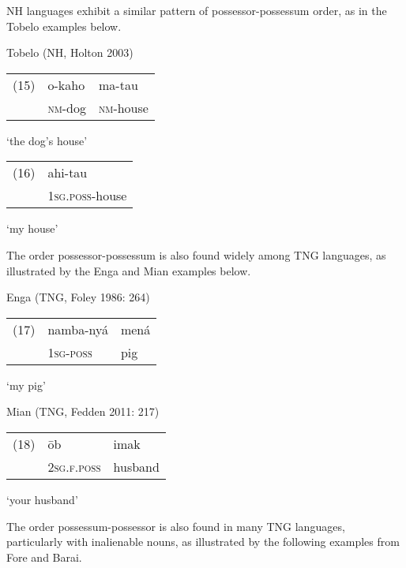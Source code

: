 NH languages exhibit a similar pattern of possessor-possessum order, as in the Tobelo examples below.

Tobelo (NH, Holton 2003)

\begin{flushleft}
\tablehead{}
\begin{supertabular}{m{0.32545984in}m{0.55315983in}m{0.6809598in}}
(15) &
o-kaho &
ma-tau\\
 &
\textsc{nm}{}-dog &
\textsc{nm}{}-house\\
\end{supertabular}
\end{flushleft}
{\textquoteleft}the dog{\textquoteright}s house{\textquoteright}  

\begin{flushleft}
\tablehead{}
\begin{supertabular}{m{0.32545984in}m{1.0518599in}}
(16) &
ahi-tau\\
 &
\textsc{1sg.poss}{}-house\\
\end{supertabular}
\end{flushleft}
{\textquoteleft}my house{\textquoteright}  

The order possessor-possessum is also found widely among TNG languages, as illustrated by the Enga and Mian examples below. 

Enga (TNG, Foley 1986: 264)

\begin{flushleft}
\tablehead{}
\begin{supertabular}{m{0.39005986in}m{1.1427599in}m{0.43305984in}}
(17) &
namba-ny\'a &
men\'a\\
 &
\textsc{1sg-poss} &
pig\\
\end{supertabular}
\end{flushleft}
{\textquoteleft}my pig{\textquoteright} 

Mian (TNG, Fedden 2011: 217)

\begin{flushleft}
\tablehead{}
\begin{supertabular}{m{0.38935986in}m{0.75255984in}m{1.0045599in}}
(18) &
\=ob &
imak\\
 &
\textsc{2sg.f.pos}\textsc{s} &
husband\\
\end{supertabular}
\end{flushleft}
{\textquoteleft}your husband{\textquoteright} 

The order possessum-possessor is also found in many TNG languages, particularly with inalienable nouns, as illustrated by the following examples from Fore and Barai. 

